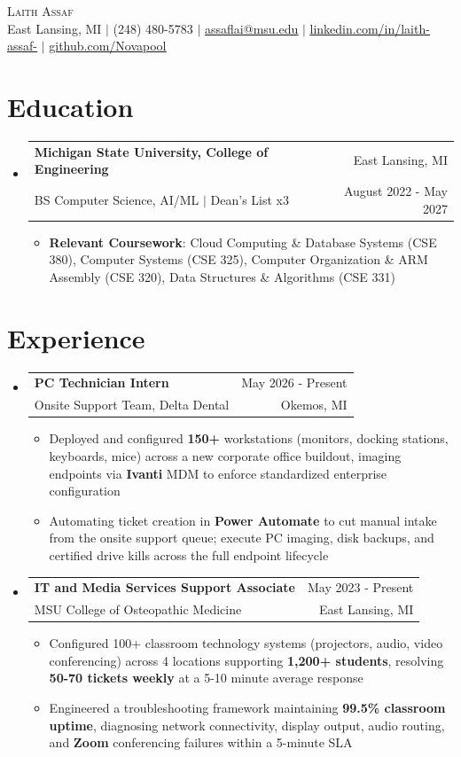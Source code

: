 \documentclass[letterpaper,11pt]{article}
\makeatletter
\newcommand{\resumeItem}[1]{
  \item\small{
    {#1 \vspace{-2pt}}
  }
}
\newcommand{\resumeSubheading}[4]{
  \vspace{-2pt}\item
    \begin{tabular*}{0.97\textwidth}[t]{l@{\extracolsep{\fill}}r}
      \textbf{#1} & \small #2 \\
      \small#3 & \small #4 \\
    \end{tabular*}\vspace{-7pt}
}
\newcommand{\resumeSubHeadingListStart}{\begin{itemize}[leftmargin=0.15in, label={}]}
\newcommand{\resumeSubHeadingListEnd}{\end{itemize}}
\newcommand{\resumeItemListStart}{\begin{itemize}}
\newcommand{\resumeItemListEnd}{\end{itemize}\vspace{-5pt}}
\makeatother
\begin{document}
\begin{center}
    {\Huge \scshape Laith Assaf} \\ \vspace{1pt}
    \small East Lansing, MI $|$ (248) 480-5783 $|$ \href{mailto:assaflai@msu.edu}{\underline{assaflai@msu.edu}} $|$ \href{https://linkedin.com/in/laith-assaf-}{\underline{linkedin.com/in/laith-assaf-}} $|$ \href{https://github.com/Novapool}{\underline{github.com/Novapool}}
\end{center}
\section{Education}
  \resumeSubHeadingListStart
    \resumeSubheading
      {Michigan State University, College of Engineering}{East Lansing, MI}
      {BS Computer Science, AI/ML $|$ Dean's List x3}{August 2022 - May 2027}
      \resumeItemListStart
        \resumeItem{\textbf{Relevant Coursework}: Cloud Computing \& Database Systems (CSE 380), Computer Systems (CSE 325), Computer Organization \& ARM Assembly (CSE 320), Data Structures \& Algorithms (CSE 331)}
      \resumeItemListEnd
  \resumeSubHeadingListEnd

\section{Experience}
  \resumeSubHeadingListStart
    \resumeSubheading
      {PC Technician Intern}{May 2026 - Present}
      {Onsite Support Team, Delta Dental}{Okemos, MI}
      \resumeItemListStart
        \resumeItem{Deployed and configured \textbf{150+} workstations (monitors, docking stations, keyboards, mice) across a new corporate office buildout, imaging endpoints via \textbf{Ivanti} MDM to enforce standardized enterprise configuration}
        \resumeItem{Automating ticket creation in \textbf{Power Automate} to cut manual intake from the onsite support queue; execute PC imaging, disk backups, and certified drive kills across the full endpoint lifecycle}
      \resumeItemListEnd
    \resumeSubheading
      {IT and Media Services Support Associate}{May 2023 - Present}
      {MSU College of Osteopathic Medicine}{East Lansing, MI}
      \resumeItemListStart
        \resumeItem{Configured 100+ classroom technology systems (projectors, audio, video conferencing) across 4 locations supporting \textbf{1,200+ students}, resolving \textbf{50-70 tickets weekly} at a 5-10 minute average response}
        \resumeItem{Engineered a troubleshooting framework maintaining \textbf{99.5\% classroom uptime}, diagnosing network connectivity, display output, audio routing, and \textbf{Zoom} conferencing failures within a 5-minute SLA}
      \resumeItemListEnd
  \resumeSubHeadingListEnd
\end{document}
